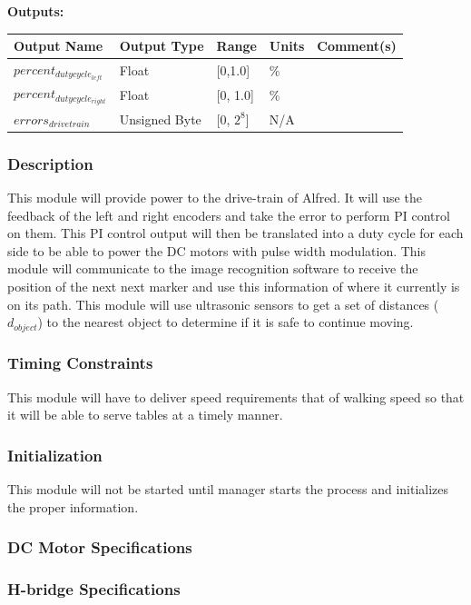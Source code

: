 \documentclass [10pt]{article}
\begin{document}
\textbf{Outputs: } 
\begin{longtable}{|l|l|l|l|l|}\hline 
	\rowcolor{tableCell}Output Name & Output Type & Range & Units & Comment(s) \\ \hline
	$ percent_{dutycycle_{left}} $ & Float & [0,1.0] & \% &  \\ \hline
	$ percent_{dutycycle_{right}} $ & Float & [0, 1.0]& \% & \\ \hline
	$ errors_{drivetrain} $ & Unsigned Byte & [0, $2^{8}$]& N/A & \\ \hline
\end{longtable}

\subsubsection{Description}
This module will provide power to the drive-train of Alfred. It will use the feedback of the left and right encoders and take the error to perform PI control on them. This PI control output will then be translated into a duty cycle for each side to be able to power the DC motors with pulse width modulation. This module will communicate to the image recognition software to receive the position of the next next marker and use this information of where it currently is on its path. This module will use ultrasonic sensors to get a set of distances ($ d_{object} $) to the nearest object to determine if it is safe to continue moving.

\subsubsection{Timing Constraints}
This module will have to deliver speed requirements that of walking speed so that it will be able to serve tables at a timely manner.

\subsubsection{Initialization}
This module will not be started until manager starts the process and initializes the proper information.

\subsubsection{DC Motor Specifications}

\subsubsection{H-bridge Specifications}
\end{document}
